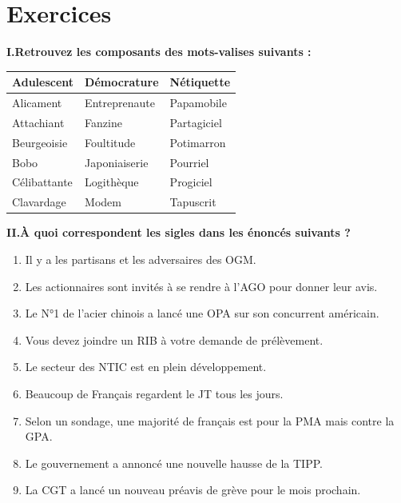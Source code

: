 \clearpage
{}
\section*{Exercices}\label{ch09-exercises}
\textbf{I.\quad Retrouvez les composants des mots-valises suivants :}
\begin{center}
\begin{tabularx}{.95\linewidth}{|>{\centering\arraybackslash}X|>{\centering\arraybackslash}X|>{\centering\arraybackslash}X|}
\hline
Adulescent&Démocrature&Nétiquette\\\hline
Alicament&Entreprenaute&Papamobile\\\hline
Attachiant&Fanzine&Partagiciel\\\hline
Beurgeoisie&Foultitude&Potimarron\\\hline
Bobo&Japoniaiserie&Pourriel\\\hline
Célibattante&Logithèque&Progiciel\\\hline
Clavardage&Modem&Tapuscrit\\\hline
\end{tabularx}
\end{center}

\textbf{II.\quad À quoi correspondent les sigles dans les énoncés suivants ?}
\begin{keybox}
\begin{enumerate}[label=\arabic*.,leftmargin=1.5em,itemsep=.3ex]
\item Il y a les partisans et les adversaires des OGM.
\item Les actionnaires sont invités à se rendre à l’AGO pour donner leur avis.
\item Le N°1 de l’acier chinois a lancé une OPA sur son concurrent américain.
\item Vous devez joindre un RIB à votre demande de prélèvement.
\item Le secteur des NTIC est en plein développement.
\item Beaucoup de Français regardent le JT tous les jours.
\item Selon un sondage, une majorité de français est pour la PMA mais contre la GPA.
\item Le gouvernement a annoncé une nouvelle hausse de la TIPP.
\item La CGT a lancé un nouveau préavis de grève pour le mois prochain.
\end{enumerate}
\end{keybox}

